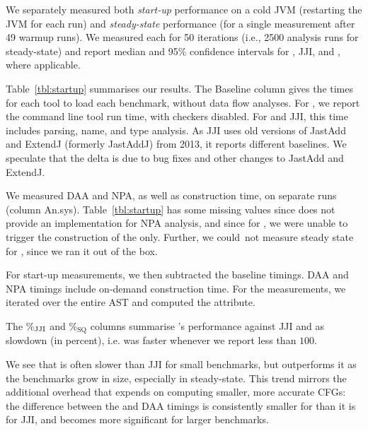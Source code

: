 We separately measured both \emph{start-up} performance on a cold JVM (restarting the JVM for each run)
and \emph{steady-state} performance (for a single measurement after 49 warmup runs).
We measured each for 50 iterations (i.e., 2500 analysis runs for steady-state) and report median and 95\% confidence intervals
for {\intraj}, JJI, and , where applicable.

Table~\ref{tbl:startup} summarises our results.
The Baseline column gives the times for each tool to load each benchmark, without data flow analyses.
For , we report the command line tool run time, with checkers disabled.
For {\intraj} and JJI, this time includes parsing, name, and type analysis.
As JJI uses old versions of JastAdd and ExtendJ (formerly JastAddJ) from 2013, it reports different baselines.
We speculate that the delta is due to bug fixes and other changes to JastAdd and ExtendJ.

We measured DAA and NPA, as well as {\CFG} construction time, on separate runs (column An.sys).
Table~\ref{tbl:startup} has some missing values since  does not provide an implementation for NPA analysis, and since for , we were unable to trigger the construction of the \CFG{} only.
Further, we could~not measure steady state for , since we ran it out of the box.

For start-up measurements, we then subtracted the baseline timings.
DAA and NPA timings include on-demand {\CFG} construction time.
For the {\CFG} measurements, we iterated over the entire AST and computed the  attribute.

The \%$_{\text{\textsc{JJI}}}$ and \%$_{\text{SQ}}$ columns summarise {\intraj}'s performance against JJI and 
as slowdown (in percent), i.e.\@ {\intraj} was faster whenever we report less than $100$.

We see that {\intraj} is often slower than JJI for small benchmarks, but outperforms it as the benchmarks grow in size, especially in steady-state.
This trend mirrors the additional overhead that {\intraj} expends on computing smaller, more accurate CFGs:
the difference between the {\CFG} and DAA timings is consistently smaller for {\intraj} than it is for {JJI}, and becomes more significant for larger benchmarks.

